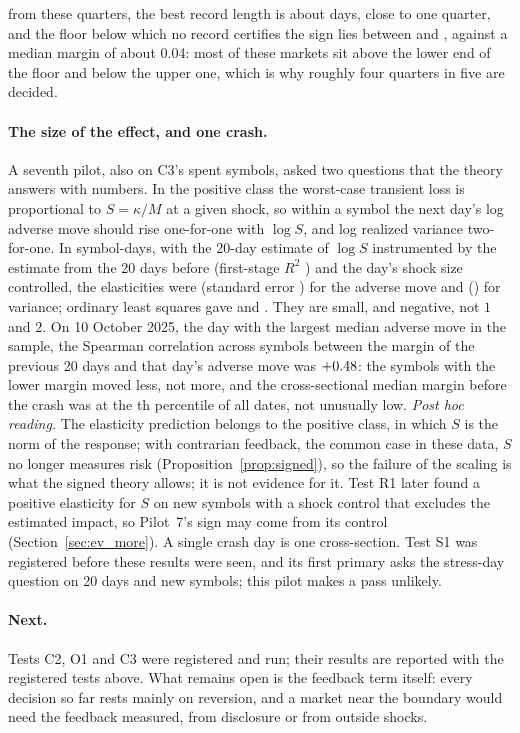 from these quarters, the best record length is about \DriftW{} days, close to one quarter, and the floor below which no record certifies the sign lies between \DriftFloorLow{} and \DriftFloor{}, against a median margin of about 0.04: most of these markets sit above the lower end of the floor and below the upper one, which is why roughly four quarters in five are decided.

\paragraph{The size of the effect, and one crash.} A seventh pilot, also on C3's spent symbols, asked two questions that the theory answers with numbers. In the positive class the worst-case transient loss is proportional to $S=\kappa/M$ at a given shock, so within a symbol the next day's log adverse move should rise one-for-one with $\log S$, and log realized variance two-for-one. In \PsevenN{} symbol-days, with the 20-day estimate of $\log S$ instrumented by the estimate from the 20 days before (first-stage $R^2$ \PsevenFS{}) and the day's shock size controlled, the elasticities were \PsevenMae{} (standard error \PsevenMaeSE{}) for the adverse move and \PsevenRv{} (\PsevenRvSE{}) for variance; ordinary least squares gave \PsevenMaeOLS{} and \PsevenRvOLS{}. They are small, and negative, not $1$ and $2$. On 10 October 2025, the day with the largest median adverse move in the sample, the Spearman correlation across \PsevenStressN{} symbols between the margin of the previous 20 days and that day's adverse move was $+0.48$: the symbols with the lower margin moved less, not more, and the cross-sectional median margin before the crash was at the \PsevenPct{}th percentile of all dates, not unusually low. \emph{Post hoc reading.} The elasticity prediction belongs to the positive class, in which $S$ is the norm of the response; with contrarian feedback, the common case in these data, $S$ no longer measures risk (Proposition~\ref{prop:signed}), so the failure of the scaling is what the signed theory allows; it is not evidence for it. Test R1 later found a positive elasticity for $S$ on new symbols with a shock control that excludes the estimated impact, so Pilot~7's sign may come from its control (Section~\ref{sec:ev_more}). A single crash day is one cross-section. Test S1 was registered before these results were seen, and its first primary asks the stress-day question on 20 days and new symbols; this pilot makes a pass unlikely.

\paragraph{Next.} Tests C2, O1 and C3 were registered and run; their results are reported with the registered tests above. What remains open is the feedback term itself: every decision so far rests mainly on reversion, and a market near the boundary would need the feedback measured, from disclosure or from outside shocks.

